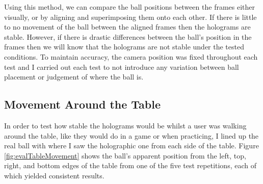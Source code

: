 \documentclass[ %
                author={Finn Alexander Wilkinson},
                supervisor={Dr. Andrew Calway},
                degree={MEng},
                title={\centering A Mixed Reality Aim Assistant for Pool and Snooker},
                subtitle={},
                type={Enterprise},
                year={2021} ]{dissertation}
\begin{document}
Using this method, we can compare the ball positions between the frames either visually, or by aligning and superimposing them onto each other. If there is little to no movement of the ball between the aligned frames then the holograms are stable. However, if there is drastic differences between the ball's position in the frames then we will know that the holograms are not stable under the tested conditions. To maintain accuracy, the camera position was fixed throughout each test and I carried out each test to not introduce any variation between ball placement or judgement of where the ball is.

\subsection{Movement Around the Table}
In order to test how stable the holograms would be whilst a user was walking around the table, like they would do in a game or when practicing, I lined up the real ball with where I saw the holographic one from each side of the table. Figure \ref{fig:evalTableMovement} shows the ball's apparent position from the left, top, right, and bottom edges of the table from one of the five test repetitions, each of which yielded consistent results.
\end{document}

